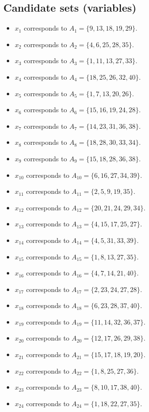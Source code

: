 \documentclass[11pt]{article}
\begin{document}
\subsection*{Candidate sets (variables)}
\begin{itemize}
\item $x_{1}$ corresponds to $A_{1}=\{9, 13, 18, 19, 29\}$.
\item $x_{2}$ corresponds to $A_{2}=\{4, 6, 25, 28, 35\}$.
\item $x_{3}$ corresponds to $A_{3}=\{1, 11, 13, 27, 33\}$.
\item $x_{4}$ corresponds to $A_{4}=\{18, 25, 26, 32, 40\}$.
\item $x_{5}$ corresponds to $A_{5}=\{1, 7, 13, 20, 26\}$.
\item $x_{6}$ corresponds to $A_{6}=\{15, 16, 19, 24, 28\}$.
\item $x_{7}$ corresponds to $A_{7}=\{14, 23, 31, 36, 38\}$.
\item $x_{8}$ corresponds to $A_{8}=\{18, 28, 30, 33, 34\}$.
\item $x_{9}$ corresponds to $A_{9}=\{15, 18, 28, 36, 38\}$.
\item $x_{10}$ corresponds to $A_{10}=\{6, 16, 27, 34, 39\}$.
\item $x_{11}$ corresponds to $A_{11}=\{2, 5, 9, 19, 35\}$.
\item $x_{12}$ corresponds to $A_{12}=\{20, 21, 24, 29, 34\}$.
\item $x_{13}$ corresponds to $A_{13}=\{4, 15, 17, 25, 27\}$.
\item $x_{14}$ corresponds to $A_{14}=\{4, 5, 31, 33, 39\}$.
\item $x_{15}$ corresponds to $A_{15}=\{1, 8, 13, 27, 35\}$.
\item $x_{16}$ corresponds to $A_{16}=\{4, 7, 14, 21, 40\}$.
\item $x_{17}$ corresponds to $A_{17}=\{2, 23, 24, 27, 28\}$.
\item $x_{18}$ corresponds to $A_{18}=\{6, 23, 28, 37, 40\}$.
\item $x_{19}$ corresponds to $A_{19}=\{11, 14, 32, 36, 37\}$.
\item $x_{20}$ corresponds to $A_{20}=\{12, 17, 26, 29, 38\}$.
\item $x_{21}$ corresponds to $A_{21}=\{15, 17, 18, 19, 20\}$.
\item $x_{22}$ corresponds to $A_{22}=\{1, 8, 25, 27, 36\}$.
\item $x_{23}$ corresponds to $A_{23}=\{8, 10, 17, 38, 40\}$.
\item $x_{24}$ corresponds to $A_{24}=\{1, 18, 22, 27, 35\}$.

\end{itemize}
\end{document}

